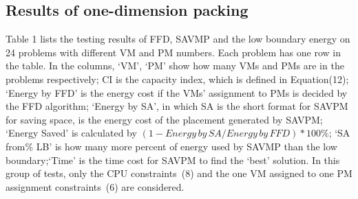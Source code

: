 \documentclass[10pt, conference, compsocconf]{IEEEtran}
\begin{document}
\subsection{Results of one-dimension packing}
Table 1 lists the testing results of FFD, SAVMP and the low boundary energy on
24 problems with different VM and PM numbers. Each problem has one row in the
table.  In the columns, `VM', `PM' show how many VMs and PMs are in the problems
respectively; CI is the capacity index, which is defined in Equation(12);
`Energy by FFD' is the energy cost if the VMs' assignment to PMs is decided by
the FFD algorithm; `Energy by SA', in which SA is the short format for SAVPM for
saving space, is the energy cost of the placement generated by SAVPM; `Energy
Saved' is calculated by $(1 - Energy\, by\, SA/Energy\, by\, FFD)*100\%$; `SA
from\% LB' is how many more percent of energy used by SAVMP than the low
boundary;`Time' is the time cost for SAVPM to find the `best' solution.
In this group of tests, only the CPU constraints~(8) and the one VM
assigned to one PM assignment constraints~(6) are considered. 
\end{document}
